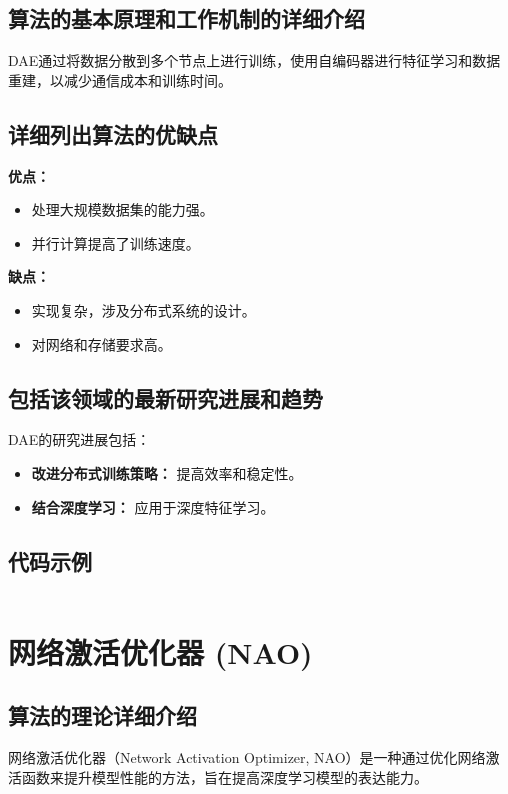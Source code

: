 \subsection*{算法的基本原理和工作机制的详细介绍}
DAE通过将数据分散到多个节点上进行训练，使用自编码器进行特征学习和数据重建，以减少通信成本和训练时间。

\subsection*{详细列出算法的优缺点}
\textbf{优点：}
\begin{itemize}
    \item 处理大规模数据集的能力强。
    \item 并行计算提高了训练速度。
\end{itemize}

\textbf{缺点：}
\begin{itemize}
    \item 实现复杂，涉及分布式系统的设计。
    \item 对网络和存储要求高。
\end{itemize}

\subsection*{包括该领域的最新研究进展和趋势}
DAE的研究进展包括：
\begin{itemize}
    \item \textbf{改进分布式训练策略：} 提高效率和稳定性。
    \item \textbf{结合深度学习：} 应用于深度特征学习。
\end{itemize}
\subsection*{代码示例}
\begin{lstlisting}

\end{lstlisting}


\section{网络激活优化器 (NAO)}
\subsection*{算法的理论详细介绍}
网络激活优化器（Network Activation Optimizer, NAO）是一种通过优化网络激活函数来提升模型性能的方法，旨在提高深度学习模型的表达能力。

